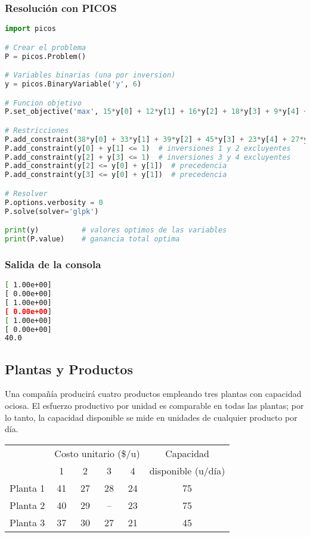 \documentclass[12pt]{article}
\begin{document}
\subsubsection{Resolución con PICOS}
\begin{lstlisting}[language=Python]
import picos

# Crear el problema
P = picos.Problem()

# Variables binarias (una por inversion)
y = picos.BinaryVariable('y', 6)

# Funcion objetivo
P.set_objective('max', 15*y[0] + 12*y[1] + 16*y[2] + 18*y[3] + 9*y[4] + 11*y[5])

# Restricciones
P.add_constraint(38*y[0] + 33*y[1] + 39*y[2] + 45*y[3] + 23*y[4] + 27*y[5] <= 100)
P.add_constraint(y[0] + y[1] <= 1)  # inversiones 1 y 2 excluyentes
P.add_constraint(y[2] + y[3] <= 1)  # inversiones 3 y 4 excluyentes
P.add_constraint(y[2] <= y[0] + y[1])  # precedencia
P.add_constraint(y[3] <= y[0] + y[1])  # precedencia

# Resolver
P.options.verbosity = 0
P.solve(solver='glpk')

print(y)          # valores optimos de las variables
print(P.value)    # ganancia total optima
\end{lstlisting}

\subsubsection{Salida de la consola}

\begin{lstlisting}[language=bash,backgroundcolor=\color{black},basicstyle=\color{white}\ttfamily,numbers=none]
[ 1.00e+00]
[ 0.00e+00]
[ 1.00e+00]
[ 0.00e+00]
[ 1.00e+00]
[ 0.00e+00]
40.0
\end{lstlisting}

\subsection{Plantas y Productos}
Una compañía producirá cuatro productos empleando tres plantas con capacidad ociosa. El esfuerzo productivo por unidad es comparable en todas las plantas; por lo tanto, la capacidad disponible se mide en unidades de cualquier producto por día.

\begin{table}[H]
    \centering
    \begin{tabular}{c|cccc|c}
        \toprule
         & \multicolumn{4}{c|}{Costo unitario (\$/u)} & Capacidad \\[-0.3em]
         & 1 & 2 & 3 & 4 & disponible (u/día) \\
        \midrule
        Planta 1 & 41 & 27 & 28 & 24 & 75 \\
        Planta 2 & 40 & 29 & -- & 23 & 75 \\
        Planta 3 & 37 & 30 & 27 & 21 & 45 \\
        \bottomrule
    \end{tabular}
\end{table}
\end{document}
